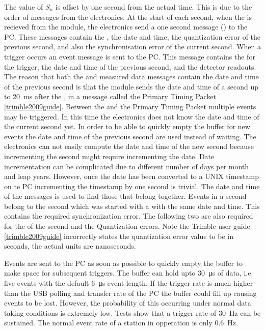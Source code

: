 The value of $S_n$ is offset by one second from the actual \gps time. This is due to the order of messages from the \hisparc electronics. At the start of each second, when the \pps is recieved from the \gps module, the \hisparc electronics send a one second message (\osm) to the PC. These messages contain the \ctp, the date and time, the quantization error of the previous second, and also the synchronisation error of the current second. When a trigger occurs an event message is sent to the PC. This message contains the \ctd for the trigger, the date and time of the previous second, and the detector readouts. The reason that both the \osm and measured data messages contain the date and time of the previous second is that the \gps module sends the date and time of a second up to \SI{20}{\milli\second} after the \pps, in a message called the Primary Timing Packet \cref{trimble2009guide}. Between the \pps and the Primary Timing Packet multiple events may be triggered. In this time the electronics does not know the date and time of the current second yet. In order to be able to quickly empty the buffer for new events the date and time of the previous second are used instead of waiting. The electronics can not easily compute the date and time of the new second because incrementing the second might require incrementing the date. Date incrementation can be complicated due to different number of days per month and leap years. However, once the date has been converted to a UNIX timestamp on te PC incrementing the timestamp by one second is trivial. The date and time of the messages is used to find those that belong together. Events in a second belong to the second which was started with a \osm with the same date and time. This \osm contains the required synchronization error. The following two \osm are also required for the \ctp of the second and the Quantization errors. Note the Trimble user guide \cref{trimble2009guide} incorrectly states the quantization error value to be in seconds, the actual units are nanoseconds.

Events are sent to the PC as soon as possible to quickly empty the buffer to make space for subsequent triggers. The buffer can hold upto \SI{30}{\us} of data, i.e. five events with the default \SI{6}{\us} event length. If the trigger rate is much higher than the USB polling and transfer rate of the PC the buffer could fill up causing events to be lost. However, the probability of this occurring under normal data taking conditions is extremely low. Tests show that a trigger rate of \SI{30}{\hertz} can be sustained. The normal event rate of a station in opperation is only \SI{0.6}{\hertz}.


